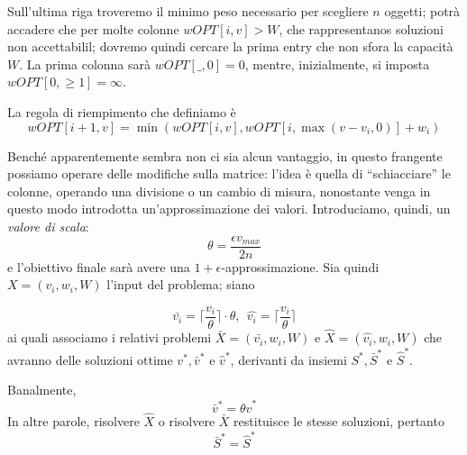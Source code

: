 Sull'ultima riga troveremo il minimo peso necessario per scegliere $n$ oggetti;
potrà accadere che per molte colonne $wOPT[i,v] > W$, che rappresentanos
soluzioni non accettabilil; dovremo quindi cercare la prima entry che non sfora
la capacità $W$. La prima colonna sarà $wOPT[\_,0] = 0$, mentre, inizialmente,
si imposta $wOPT[0,\geq1] = \infty$.

La regola di riempimento che definiamo è
$$
	wOPT[i+1, v] = \min(wOPT[i, v], wOPT[i, \max(v-v_i, 0)] + w_i)
$$

Benché apparentemente sembra non ci sia alcun vantaggio, in questo frangente
possiamo operare delle modifiche sulla matrice: l'idea è quella di ``schiacciare''
le colonne, operando una divisione o un cambio di misura, nonostante venga
in questo modo introdotta un'approssimazione dei valori. Introduciamo,
quindi, un \textit{valore di scala}:
$$
	\theta = \frac{\epsilon v_{max}}{2n}
$$
e l'obiettivo finale sarà avere una $1+\epsilon$-approssimazione.
Sia quindi $X=(v_i, w_i, W)$ l'input del problema; siano

$$
	\bar{v_i} = \lceil\frac{v_i}{\theta}\rceil\cdot \theta, ~~ \hat{v_i} = \lceil \frac{v_i}{\theta}\rceil
$$
ai quali associamo i relativi problemi $\bar{X} = (\bar{v_i}, w_i, W)$
e $\hat{X} = (\hat{v_i}, w_i, W)$
che avranno delle soluzioni ottime $v^*, \bar{v}^*$ e $\hat{v}^*$, derivanti
da insiemi $S^*, \bar{S}^*$ e $\hat{S}^*$.

\begin{oss} \label{oss:knapsack_barv_t_hatv}
	Banalmente,
	$$
		\bar{v}^* = \theta \hat{v}^*
	$$
	In altre parole, risolvere $\hat{X}$ o risolvere $\bar{X}$ restituisce le
	stesse soluzioni, pertanto
	$$
		\bar{S}^* = \hat{S}^*
	$$

\end{oss}

